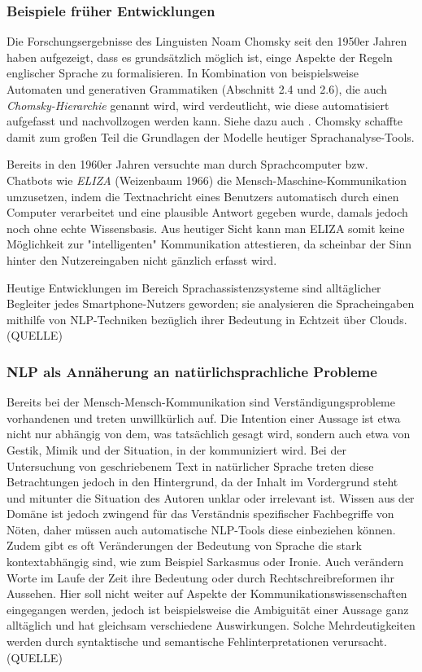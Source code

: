\documentclass[12pt]{paper}
\begin{document}
\subsubsection{Beispiele früher Entwicklungen}
Die Forschungsergebnisse des Linguisten Noam Chomsky seit den 1950er Jahren haben aufgezeigt, dass es grundsätzlich möglich ist, einge Aspekte der Regeln englischer Sprache zu formalisieren. In Kombination von beispielsweise Automaten und generativen Grammatiken (Abschnitt 2.4 und 2.6), die auch \textit{Chomsky-Hierarchie} genannt wird, wird verdeutlicht, wie diese automatisiert aufgefasst und nachvollzogen werden kann. Siehe dazu auch \cite{cho57}. Chomsky schaffte damit zum großen Teil die Grundlagen der Modelle heutiger Sprachanalyse-Tools.

Bereits in den 1960er Jahren versuchte man durch Sprachcomputer bzw. Chatbots wie \textit{ELIZA} (Weizenbaum 1966) die Mensch-Maschine-Kommunikation umzusetzen, indem die Textnachricht eines Benutzers automatisch durch einen Computer verarbeitet und eine plausible Antwort gegeben wurde, damals jedoch noch ohne echte Wissensbasis. Aus heutiger Sicht kann man ELIZA somit keine Möglichkeit zur "intelligenten" Kommunikation attestieren, da scheinbar der Sinn hinter den Nutzereingaben nicht gänzlich erfasst wird.

Heutige Entwicklungen im Bereich Sprachassistenzsysteme sind alltäglicher Begleiter jedes Smartphone-Nutzers geworden; sie analysieren die Spracheingaben mithilfe von NLP-Techniken bezüglich ihrer Bedeutung in Echtzeit über Clouds. (QUELLE)

\subsubsection{NLP als Annäherung an natürlichsprachliche Probleme}
Bereits bei der Mensch-Mensch-Kommunikation sind  Verständigungsprobleme vorhandenen und treten unwillkürlich auf. Die Intention einer Aussage ist etwa nicht nur abhängig von dem, was tatsächlich gesagt wird, sondern auch etwa von Gestik, Mimik und der Situation, in der kommuniziert wird. Bei der Untersuchung von geschriebenem Text in natürlicher Sprache treten diese Betrachtungen jedoch in den Hintergrund, da der Inhalt im Vordergrund steht und mitunter die Situation des Autoren unklar oder irrelevant ist. Wissen aus der Domäne ist jedoch zwingend für das Verständnis spezifischer Fachbegriffe von Nöten, daher müssen auch automatische NLP-Tools diese einbeziehen können. Zudem gibt es oft Veränderungen der Bedeutung von Sprache die stark kontextabhängig sind, wie zum Beispiel Sarkasmus oder Ironie. Auch verändern Worte im Laufe der Zeit ihre Bedeutung oder durch Rechtschreibreformen ihr Aussehen. Hier soll nicht weiter auf Aspekte der Kommunikationswissenschaften eingegangen werden, jedoch ist beispielsweise die Ambiguität einer Aussage ganz alltäglich und hat gleichsam verschiedene Auswirkungen. Solche Mehrdeutigkeiten werden durch syntaktische und semantische Fehlinterpretationen verursacht. (QUELLE)
\end{document}
